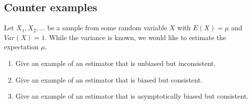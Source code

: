 \documentclass{article}
\begin{document}
\subsection{Counter examples}

Let $X_{1},X_{2},\ldots $ be a sample from some random variable $X$ with $%
E(X)=\mu $ and $Var(X)=1$. While the variance is known, we would like to
estimate the expectation $\mu $.

\begin{enumerate}
\item Give an example of an estimator that is unbiased but inconsistent.

\item Give an example of an estimator that is biased but consistent.

\item Give an example of an estimator that is asymptotically biased but
consistent.
\end{enumerate}
\end{document}
